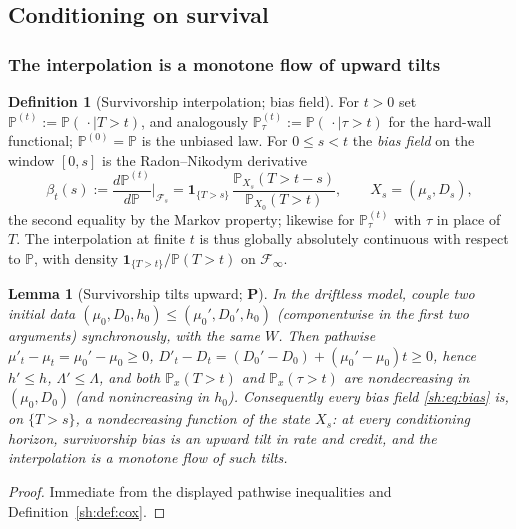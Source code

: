 \documentclass[11pt]{article}
\numberwithin{equation}{section}
\theoremstyle{plain}
\newtheorem{lemma}[theorem]{Lemma}
\theoremstyle{definition}
\newtheorem{definition}[theorem]{Definition}
\theoremstyle{remark}
\newcommand{\PP}{\mathbb{P}}
\newcommand{\one}{\mathbf{1}}
\newcommand{\Fc}{\mathcal{F}}
\begin{document}
\subsection{Conditioning on survival}\label{gr1:sub:cond}\label{sh:sub:interp}

\subsubsection{The interpolation is a monotone flow of upward tilts}
\label{sh:subsub:flow}

\begin{definition}[Survivorship interpolation; bias field]
\label{sh:def:interp}
For $t>0$ set $\PP^{(t)}:=\PP(\,\cdot\mid T>t)$, and analogously
$\PP^{(t)}_\tau:=\PP(\,\cdot\mid\tau>t)$ for the hard-wall functional;
$\PP^{(0)}=\PP$ is the unbiased law. For $0\le s<t$ the \emph{bias field}
on the window $[0,s]$ is the Radon--Nikodym derivative
\begin{equation}\label{sh:eq:bias}
\beta_t(s):=\frac{d\PP^{(t)}}{d\PP}\Big|_{\Fc_s}
=\one_{\{T>s\}}\,
\frac{\PP_{X_s}(T>t-s)}{\PP_{X_0}(T>t)},
\qquad X_s=(\mu_s,D_s),
\end{equation}
the second equality by the Markov property; likewise for
$\PP^{(t)}_\tau$ with $\tau$ in place of $T$. The interpolation at finite
$t$ is thus globally absolutely continuous with respect to $\PP$, with
density $\one_{\{T>t\}}/\PP(T>t)$ on $\Fc_\infty$.
\end{definition}

\begin{lemma}[Survivorship tilts upward; \textbf{P}]\label{sh:lem:monotone}
In the driftless model, couple two initial data
$(\mu_0,D_0,h_0)\le(\mu_0',D_0',h_0)$ (componentwise in the first two
arguments) synchronously, with the same $W$. Then pathwise
$\mu'_t-\mu_t=\mu_0'-\mu_0\ge0$,
$D'_t-D_t=(D_0'-D_0)+(\mu_0'-\mu_0)t\ge0$, hence $h'\le h$,
$\Lambda'\le\Lambda$, and both $\PP_x(T>t)$ and $\PP_x(\tau>t)$ are
nondecreasing in $(\mu_0,D_0)$ (and nonincreasing in $h_0$). Consequently
every bias field \eqref{sh:eq:bias} is, on $\{T>s\}$, a nondecreasing
function of the state $X_s$: at every conditioning horizon, survivorship
bias is an upward tilt in rate and credit, and the interpolation is a
monotone flow of such tilts.
\end{lemma}

\begin{proof}
Immediate from the displayed pathwise inequalities and
Definition~\ref{sh:def:cox}.
\end{proof}
\end{document}
